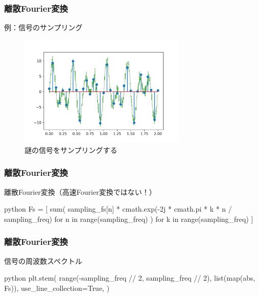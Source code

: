 \documentclass[dvipdfmx,11pt,notheorems]{beamer}
\theoremstyle{definition}
\begin{document}
\begin{frame}[fragile]\frametitle{離散Fourier変換}

\begin{block}{例：信号のサンプリング}
\begin{figure}
  \centering
  \includegraphics[width=8cm]{sampling.png}
  \caption{謎の信号をサンプリングする}
\end{figure}

\end{block}
\end{frame}

\begin{frame}[fragile]\frametitle{離散Fourier変換}
\begin{exampleblock}{離散Fourier変換（高速Fourier変換ではない！）}
\begin{pygments}{python}
Fs = [
    sum(
        sampling_fs[n]
        * cmath.exp(-2j * cmath.pi * k * n / sampling_freq)
        for n in range(sampling_freq)
    )
    for k in range(sampling_freq)
]
\end{pygments}
\end{exampleblock}

\end{frame}

\begin{frame}[fragile]\frametitle{離散Fourier変換}
\begin{exampleblock}{信号の周波数スペクトル}
\begin{pygments}{python}
plt.stem(
    range(-sampling_freq // 2, sampling_freq // 2),
    list(map(abs, Fs)),
    use_line_collection=True,
)
\end{pygments}
\end{exampleblock}

\end{frame}
\end{document}
